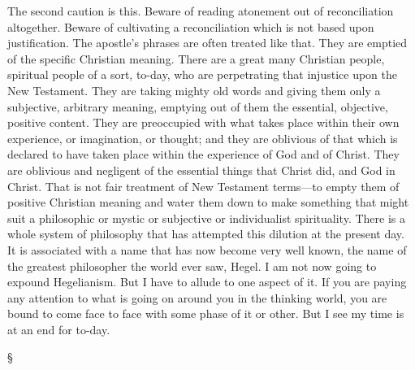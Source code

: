 \documentclass[12pt,a5paper,twoside,titlepage]{book}
\begin{document}
The second caution is this. Beware of reading 
atonement out of reconciliation altogether. 
Beware of cultivating a reconciliation which is 
not based upon justification. The apostle's 
phrases are often treated like that. They are 
emptied of the specific Christian meaning. 
There are a great many Christian people, 
spiritual people of a sort, to-day, who are 
perpetrating that injustice upon the New 
Testament. They are taking mighty old words 
and giving them only a subjective, arbitrary 
meaning, emptying out of them the essential, 
objective, positive content. They are preoccupied 
with what takes place within their 
own experience, or imagination, or thought; 
and they are oblivious of that which is 
declared to have taken place within the experience 
of God and of Christ. They are 
oblivious and negligent of the essential things 
that Christ did, and God in Christ. That is 
not fair treatment of New Testament terms---to 
empty them of positive Christian meaning 
and water them down to make something 
that might suit a philosophic or mystic or 
subjective or individualist spirituality. There 
is a whole system of philosophy that has 
attempted this dilution at the present day. It 
is associated with a name that has now become 
very well known, the name of the greatest 
philosopher the world ever saw, Hegel. I am 
not now going to expound Hegelianism. But 
I have to allude to one aspect of it. If you 
are paying any attention to what is going on 
around you in the thinking world, you are 
bound to come face to face with some phase 
of it or other. But I see my time is at an end 
for to-day. 

\begin{center}
\S
\end{center}
\end{document}
